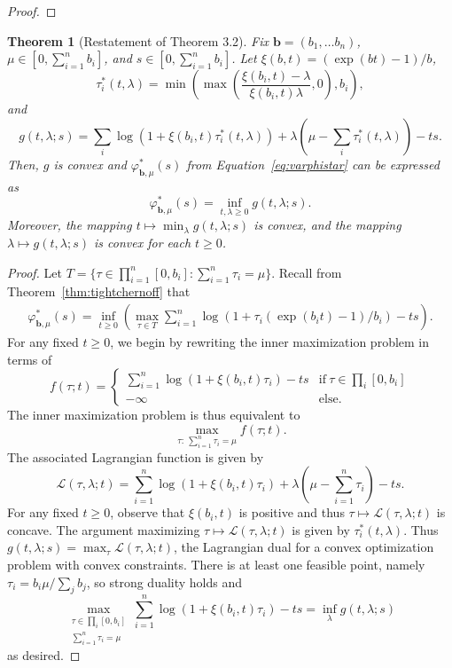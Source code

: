 \documentclass[12pt]{article}
\theoremstyle{plain}
\newtheorem*{theorem*}{Theorem}
\begin{document}
\begin{appendix}
\begin{proof}
\end{proof}

\begin{theorem*}[Restatement of Theorem 3.2] Fix $\boldsymbol{b}=(b_1,\ldots b_n)$, $\mu \in [0,\sum_{i=1}^n b_i]$, and $s \in [0,\sum_{i=1}^n b_i]$.  Let $\xi(b,t) = (\exp(bt)-1)/b$,
\[
\tau^*_i(t,\lambda) = \min\left(\max\left(\frac{\xi(b_i,t)-\lambda}{\xi(b_i,t)\lambda},0\right),b_i\right),
\]
and
\[
g(t,\lambda;s) = \sum_i \log\left(1+\xi(b_i,t)\tau_i^*(t,\lambda)\right) + \lambda\left(\mu - \sum_i \tau_i^*(t,\lambda)\right)- ts.
\]
Then, $g$ is convex and $\varphi^*_{\boldsymbol{b},\mu}(s)$ from Equation~\ref{eq:varphistar} can be expressed as
\[
\varphi^*_{\boldsymbol{b},\mu}(s) = \inf_{t,\lambda \geq 0} g(t,\lambda;s).
\]
Moreover, the mapping $t \mapsto \min_\lambda g(t,\lambda;s)$ is convex, and the mapping $\lambda \mapsto g(t,\lambda;s)$ is convex for each $t \geq 0$.
\end{theorem*}

\begin{proof}
Let $T=\{\tau\in \prod_{i=1}^n [0,b_i]: \sum_{i=1}^n \tau_i = \mu\}$.  Recall from Theorem~\ref{thm:tightchernoff} that
\begin{gather*}
\varphi^*_{\boldsymbol{b},\mu}(s)
= \inf_{t\geq 0} \left(\max_{\tau \in T} \sum_{i=1}^n \log\left(1+\tau_i (\exp(b_i t)-1)/b_i \right) - ts\right).
\end{gather*}
For any fixed $t\geq0$, we begin by rewriting the inner maximization problem
in terms of
\[
f(\tau;t)=\begin{cases}
\sum_{i=1}^n\log\left(1+\xi(b_i,t)\tau_{i}\right)-ts & \mathrm{if}\ \tau\in\prod_{i}[0,b_i]\\
-\infty & \mathrm{else}.
\end{cases}
\]
The inner maximization problem is thus equivalent to
\[
\max_{\tau:\ \sum_{i=1}^n\tau_{i}=\mu}f(\tau;t).
\]
The associated Lagrangian function is given by
\[
\mathcal{L}(\tau,\lambda;t)=\sum_{i=1}^n\log\left(1+\xi(b_i,t)\tau_{i}\right)+\lambda\left(\mu-\sum_{i=1}^n\tau_{i}\right)-ts.
\]
For any fixed $t\geq0$, observe that $\xi(b_i,t)$ is positive
and thus $\tau\mapsto\mathcal{L}\left(\tau,\lambda;t\right)$ is concave.
The argument maximizing $\tau\mapsto\mathcal{L}(\tau,\lambda;t)$
is given by $\tau_{i}^{*}(t,\lambda)$. Thus $g(t,\lambda;s)=\max_{\tau}\mathcal{L}(\tau,\lambda;t)$,
the Lagrangian dual for a convex optimization problem with convex
constraints. There is at least one feasible point, namely $\tau_{i}=b_i\mu/\sum_{j}b_{j}$,
so strong duality holds and
\[
\max_{\substack{\tau\in\prod_{i}[0,b_i]\\
\sum_{i=1}^n\tau_{i}=\mu
}
}\sum_{i=1}^n\log\left(1+\xi(b_i,t)\tau_{i}\right)-ts=\inf_{\lambda}g(t,\lambda;s)
\]
as desired.


\end{proof}
\end{appendix}
\end{document}

